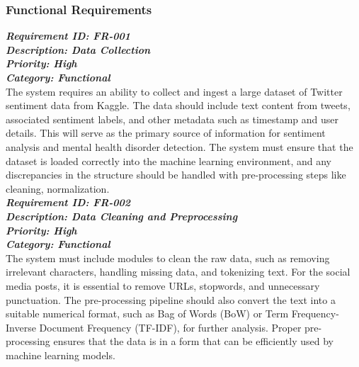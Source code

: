 
\subsubsection{Functional Requirements}

\noindent
\textbf{\emph{Requirement ID: FR-001}} \\ 
\textbf{\emph{Description: Data Collection}} \\
\textbf{\emph{Priority: High}} \\
\textbf{\emph{Category: Functional}} \\
\noindent
The system requires an ability to collect and ingest a large dataset of Twitter sentiment data from Kaggle. The data should include text content from tweets, associated sentiment labels, and other metadata such as timestamp and user details. This will serve as the primary source of information for sentiment analysis and mental health disorder detection. The system must ensure that the dataset is loaded correctly into the machine learning environment, and any discrepancies in the structure should be handled with pre-processing steps like cleaning, normalization. \\

\noindent
\textbf{\emph{Requirement ID: FR-002}} \\ 
\textbf{\emph{Description: Data Cleaning and Preprocessing}} \\
\textbf{\emph{Priority: High}} \\
\textbf{\emph{Category: Functional}} \\
\noindent
The system must include modules to clean the raw data, such as removing irrelevant characters, handling missing data, and tokenizing text. For the social media posts, it is essential to remove URLs, stopwords, and unnecessary punctuation. The pre-processing pipeline should also convert the text into a suitable numerical format, such as Bag of Words (BoW) or Term Frequency-Inverse Document Frequency (TF-IDF), for further analysis. Proper pre-processing ensures that the data is in a form that can be efficiently used by machine learning models. \\

